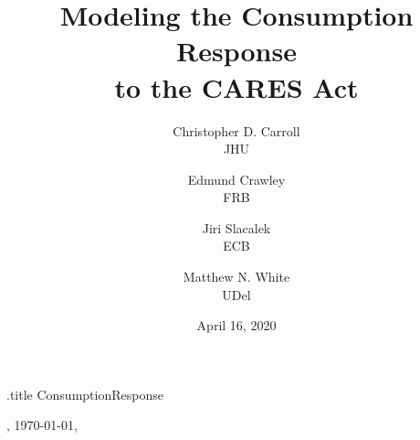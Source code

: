\documentclass[titlepage]{\econtex}
\renewcommand{\forcedate}{April 16, 2020}
\begin{document}


\begin{verbatimwrite}{\jobname.title}
  ConsumptionResponse
\end{verbatimwrite}

\hfill{\tiny \jobname, \today, \currenttime}

\title{Modeling the Consumption Response\\ to the CARES Act}

{
  \author{
    Christopher D. Carroll\authNum \\ {\small JHU}
    \and
    Edmund Crawley\authNum   \\ {\small FRB}
    \and
    Jiri Slacalek\authNum    \\ {\small ECB}
    \and
    Matthew N. White\authNum \\ {\small UDel}
  }
} %



\date{\forcedate}
\maketitle
\end{document}
